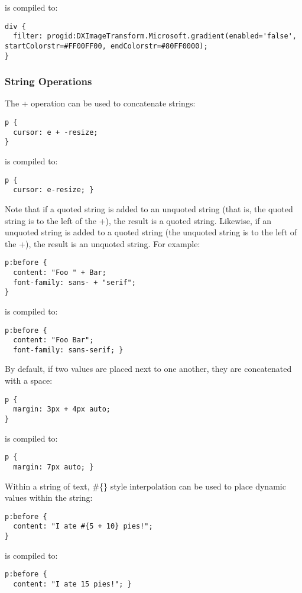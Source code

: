 \documentclass[10pt]{article}
\begin{document}
 is compiled to:
\begin{verbatim}
div {
  filter: progid:DXImageTransform.Microsoft.gradient(enabled='false', startColorstr=#FF00FF00, endColorstr=#80FF0000);
}
\end{verbatim}
\subsubsection{String Operations}


 The + operation can be used to concatenate strings:
\begin{verbatim}
p {
  cursor: e + -resize;
}
\end{verbatim}


 is compiled to:
\begin{verbatim}
p {
  cursor: e-resize; }
\end{verbatim}


 Note that if a quoted string is added to an unquoted string (that is, the quoted string is to the left of the +), the result is a quoted string. Likewise, if an unquoted string is added to a quoted string (the unquoted string is to the left of the +), the result is an unquoted string. For example:
\begin{verbatim}
p:before {
  content: "Foo " + Bar;
  font-family: sans- + "serif";
}
\end{verbatim}


 is compiled to:
\begin{verbatim}
p:before {
  content: "Foo Bar";
  font-family: sans-serif; }
\end{verbatim}


 By default, if two values are placed next to one another, they are concatenated with a space:
\begin{verbatim}
p {
  margin: 3px + 4px auto;
}
\end{verbatim}


 is compiled to:
\begin{verbatim}
p {
  margin: 7px auto; }
\end{verbatim}


 Within a string of text, \#\{\} style interpolation can be used to place dynamic values within the string:
\begin{verbatim}
p:before {
  content: "I ate #{5 + 10} pies!";
}
\end{verbatim}


 is compiled to:
\begin{verbatim}
p:before {
  content: "I ate 15 pies!"; }
\end{verbatim}
\end{document}
